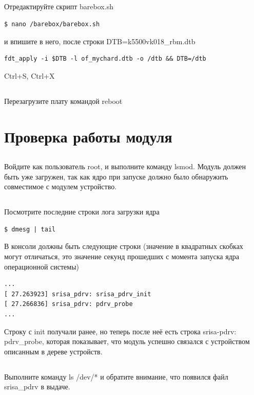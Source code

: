 \subsection{}Отредактируйте скрипт barebox.sh
\begin{lstlisting}[style=bash]
$ nano /barebox/barebox.sh
\end{lstlisting}
и впишите в него, после строки DTB=k5500vk018\_rbm.dtb
\begin{lstlisting}[style=stdout]
fdt_apply -i $DTB -l of_mychard.dtb -o /dtb && DTB=/dtb
\end{lstlisting}
Ctrl+S, Ctrl+X 

\subsection{} Перезагрузите плату командой reboot

\section{Проверка работы модуля}

\subsection{} Войдите как пользователь root, и выполните команду lsmod.
Модуль должен быть уже загружен, так как ядро при запуске должно было обнаружить  совместимое с модулем устройство. 

\subsection{} Посмотрите последние строки лога загрузки ядра
\begin{lstlisting}[style=bash]
$ dmesg | tail
\end{lstlisting}
В консоли должны быть следующие строки (значение в квадратных скобках могут отличаться, это значение секунд прошедших с момента запуска ядра операционной системы)
\begin{lstlisting}[style=stdout]
...
[ 27.263923] srisa_pdrv: srisa_pdrv_init
[ 27.266836] srisa_pdrv: pdrv_probe
...
\end{lstlisting}

Строку с init получали ранее, но теперь после неё есть строка srisa-pdrv: pdrv\_probe, которая показывает, что  модуль успешно связался с устройством описанным в дереве устройств.

\subsection{} Выполните команду ls /dev/* и обратите внимание, что появился файл srisa\_pdrv в выдаче.

